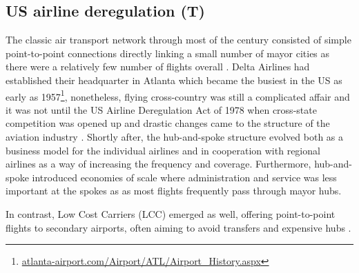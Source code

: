 \label{sec:background}

\subsection{US airline deregulation (T)}
\label{subsec:b_deregulation}
The classic air transport network through most of the  century consisted of simple point-to-point connections directly linking a small number of mayor cities as there were a relatively few number of flights overall \citep{marti2015efficiency}. Delta Airlines had established their headquarter in Atlanta which became the busiest in the US as early as 1957\footnote{\href{https://web.archive.org/web/20110301150527/http://www.atlanta-airport.com/Airport/ATL/Airport_History.aspx}{atlanta-airport.com/Airport/ATL/Airport_History.aspx}}, nonetheless, flying cross-country was still a complicated affair and it was not until the US Airline Deregulation Act of 1978 when cross-state competition was opened up and drastic changes came to the structure of the aviation industry \citep{forbes2007role, daraban2012low}. Shortly after, the hub-and-spoke structure evolved both as a business model for the individual airlines and in cooperation with regional airlines \citep{forbes2007role} as a way of increasing the frequency and coverage. Furthermore, hub-and-spoke introduced economies of scale where administration and service was less important at the spokes as as most flights frequently pass through mayor hubs.
\par
In contrast, Low Cost Carriers (LCC) emerged as well, offering point-to-point flights to secondary airports, often aiming to avoid transfers and expensive hubs \citep{daraban2012low}.

